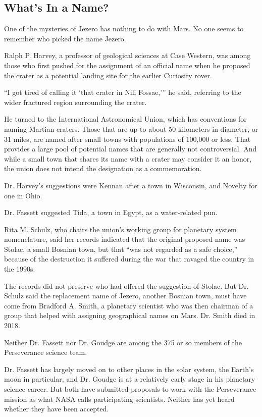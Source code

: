 \hypertarget{whats-in-a-name}{%
\subsection{What's In a Name?}\label{whats-in-a-name}}

One of the mysteries of Jezero has nothing to do with Mars. No one seems
to remember who picked the name Jezero.

Ralph P. Harvey, a professor of geological sciences at Case Western, was
among those who first pushed for the assignment of an official name when
he proposed the crater as a potential landing site for the earlier
Curiosity rover.

``I got tired of calling it `that crater in Nili Fossae,''' he said,
referring to the wider fractured region surrounding the crater.

He turned to the International Astronomical Union, which has conventions
for naming Martian craters. Those that are up to about 50 kilometers in
diameter, or 31 miles, are named after small towns with populations of
100,000 or less. That provides a large pool of potential names that are
generally not controversial. And while a small town that shares its name
with a crater may consider it an honor, the union does not intend the
designation as a commemoration.

Dr. Harvey's suggestions were Kennan after a town in Wisconsin, and
Novelty for one in Ohio.

Dr. Fassett suggested Tida, a town in Egypt, as a water-related pun.

Rita M. Schulz, who chairs the union's working group for planetary
system nomenclature, said her records indicated that the original
proposed name was Stolac, a small Bosnian town, but that ``was not
regarded as a safe choice,'' because of the destruction it suffered
during the war that ravaged the country in the 1990s.

The records did not preserve who had offered the suggestion of Stolac.
But Dr. Schulz said the replacement name of Jezero, another Bosnian
town, must have come from Bradford A. Smith, a planetary scientist who
was then chairman of a group that helped with assigning geographical
names on Mars. Dr. Smith died in 2018.

Neither Dr. Fassett nor Dr. Goudge are among the 375 or so members of
the Perseverance science team.

Dr. Fassett has largely moved on to other places in the solar system,
the Earth's moon in particular, and Dr. Goudge is at a relatively early
stage in his planetary science career. But both have submitted proposals
to work with the Perseverance mission as what NASA calls participating
scientists. Neither has yet heard whether they have been accepted.

